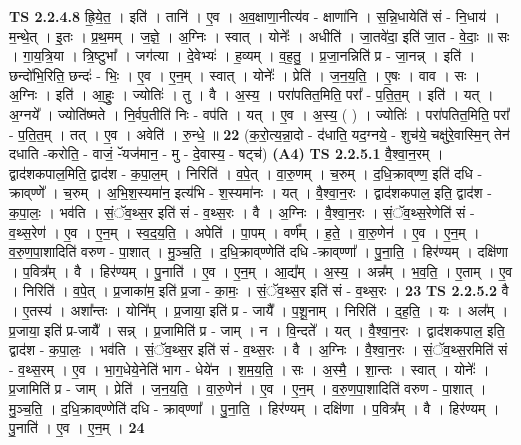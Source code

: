 \documentclass[17pt]{extarticle}
\begin{document}
                  \newline
                                \textbf{ TS 2.2.4.8} \newline
                  ह्रि॒ये॒त॒ । इति॑ । तानि॑ । ए॒व । अ॒व॒क्षाणा॒नीत्य॑व - क्षाणा॑नि । स॒न्नि॒धायेति॑ सं - नि॒धाय॑ । म॒न्थे॒त् । इ॒तः । प्र॒थ॒मम् । ज॒ज्ञे॒ । अ॒ग्निः । स्वात् । योनेः᳚ । अधीति॑ । जा॒तवे॑दा॒ इति॑ जा॒त - वे॒दाः॒ ॥ सः । गा॒य॒त्रि॒या । त्रि॒ष्टुभा᳚ । जग॑त्या । दे॒वेभ्यः॑ । ह॒व्यम् । व॒ह॒तु॒ । प्र॒जा॒नन्निति॑ प्र - जा॒नन्न् । इति॑ । छन्दो॑भि॒रिति॒ छन्दः॑ - भिः॒ । ए॒व । ए॒न॒म् । स्वात् । योनेः᳚ । प्रेति॑ । ज॒न॒य॒ति॒ । ए॒षः । वाव । सः । अ॒ग्निः । इति॑ । आ॒हुः॒ । ज्योतिः॑ । तु । वै । अ॒स्य॒ । परा॑पतित॒मिति॒ परा᳚ - प॒ति॒त॒म् । इति॑ । यत् । अ॒ग्नये᳚ । ज्योति॑ष्मते । नि॒र्वप॒तीति॑ निः - वप॑ति । यत् । ए॒व । अ॒स्य॒ ( ) । ज्योतिः॑ । परा॑पतित॒मिति॒ परा᳚ - प॒ति॒त॒म् । तत् । ए॒व । अवेति॑ । रु॒न्धे॒ ॥ \textbf{  22} \newline
                  \newline
                      (क॒रो॒त्य॒न्ना॒दो - द॑धाति॒ यद॒ग्नये॒ - शुच॑ये॒ चक्षु॑रे॒वास्मि॒न् तेन॑ दधाति -करोति॒ - वाजं॒ -ॅयज॑मान॒ - मु - दे॒वास्य॒ - षट्च॑)  \textbf{(A4)} \newline \newline
                                \textbf{ TS 2.2.5.1} \newline
                  वै॒श्वा॒न॒रम् । द्वाद॑शकपाल॒मिति॒ द्वाद॑श - क॒पा॒ल॒म् । निरिति॑ । व॒पे॒त् । वा॒रु॒णम् । च॒रुम् । द॒धि॒क्राव्‌ण्ण॒ इति॑ दधि - क्राव्‌ण्णे᳚ । च॒रुम् । अ॒भि॒श॒स्यमा॑न॒ इत्य॑भि - श॒स्यमा॑नः । यत् । वै॒श्वा॒न॒रः । द्वाद॑शकपाल॒ इति॒ द्वाद॑श - क॒पा॒लः॒ । भव॑ति । सं॒ॅव॒थ्स॒र इति॑ सं - व॒थ्स॒रः । वै । अ॒ग्निः । वै॒श्वा॒न॒रः । सं॒ॅव॒थ्स॒रेणेति॑ सं - व॒थ्स॒रेण॑ । ए॒व । ए॒न॒म् । स्व॒द॒य॒ति॒ । अपेति॑ । पा॒पम् । वर्ण᳚म् । ह॒ते॒ । वा॒रु॒णेन॑ । ए॒व । ए॒न॒म् । व॒रु॒ण॒पा॒शादिति॑ वरुण - पा॒शात् । मु॒ञ्च॒ति॒ । द॒धि॒क्राव्‌ण्णेति॑ दधि -क्राव्‌ण्णा᳚ । पु॒ना॒ति॒ । हिर॑ण्यम् । दक्षि॑णा । प॒वित्र᳚म् । वै । हिर॑ण्यम् । पु॒नाति॑ । ए॒व । ए॒न॒म् । आ॒द्य᳚म् । अ॒स्य॒ । अन्न᳚म् । भ॒व॒ति॒ । ए॒ताम् । ए॒व । निरिति॑ । व॒पे॒त् । प्र॒जाका॑म॒ इति॑ प्र॒जा - का॒मः॒ । सं॒ॅव॒थ्स॒र इति॑ सं - व॒थ्स॒रः । \textbf{  23} \newline
                  \newline
                                \textbf{ TS 2.2.5.2} \newline
                  वै । ए॒तस्य॑ । अशा᳚न्तः । योनि᳚म् । प्र॒जाया॒ इति॑ प्र - जायै᳚ । प॒शू॒नाम् । निरिति॑ । द॒ह॒ति॒ । यः । अल᳚म् । प्र॒जाया॒ इति॑ प्र-जायै᳚ । सन्न् । प्र॒जामिति॑ प्र - जाम् । न । वि॒न्दते᳚ । यत् । वै॒श्वा॒न॒रः । द्वाद॑शकपाल॒ इति॒ द्वाद॑श - क॒पा॒लः॒ । भव॑ति । सं॒ॅव॒थ्स॒र इति॑ सं - व॒थ्स॒रः । वै । अ॒ग्निः । वै॒श्वा॒न॒रः । सं॒ॅव॒थ्स॒रमिति॑ सं - व॒थ्स॒रम् । ए॒व । भा॒ग॒धेये॒नेति॑ भाग - धेये॑न । श॒म॒य॒ति॒ । सः । अ॒स्मै॒ । शा॒न्तः । स्वात् । योनेः᳚ । प्र॒जामिति॑ प्र - जाम् । प्रेति॑ । ज॒न॒य॒ति॒ । वा॒रु॒णेन॑ । ए॒व । ए॒न॒म् । व॒रु॒ण॒पा॒शादिति॑ वरुण - पा॒शात् । मु॒ञ्च॒ति॒ । द॒धि॒क्राव्‌ण्णेति॑ दधि - क्राव्‌ण्णा᳚ । पु॒ना॒ति॒ । हिर॑ण्यम् । दक्षि॑णा । प॒वित्र᳚म् । वै । हिर॑ण्यम् । पु॒नाति॑ । ए॒व । ए॒न॒म् । \textbf{  24} \newline
\end{document}
